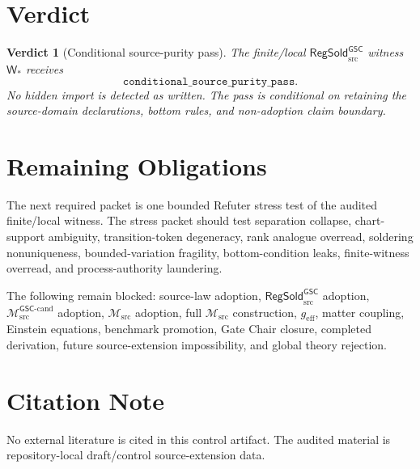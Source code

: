 \documentclass[11pt]{article}
\newcommand{\Msrc}{\mathcal{M}_{\mathrm{src}}}
\newcommand{\Mgsccand}{\mathcal{M}_{\mathrm{src}}^{\mathsf{GSC}\text{-}\mathrm{cand}}}
\newcommand{\geff}{g_{\mathrm{eff}}}
\newcommand{\RegSold}{\mathsf{RegSold}_{\mathrm{src}}^{\mathsf{GSC}}}
\newtheorem{verdict}{Verdict}
\begin{document}
\section{Verdict}

\begin{verdict}[Conditional source-purity pass]
The finite/local \(\RegSold\) witness \(\mathsf{W}_*\) receives
\[
  \texttt{conditional\_source\_purity\_pass}.
\]
No hidden import is detected as written. The pass is conditional on retaining
the source-domain declarations, bottom rules, and non-adoption claim boundary.
\end{verdict}

\section{Remaining Obligations}

The next required packet is one bounded Refuter stress test of the audited
finite/local witness. The stress packet should test separation collapse,
chart-support ambiguity, transition-token degeneracy, rank analogue overread,
soldering nonuniqueness, bounded-variation fragility, bottom-condition leaks,
finite-witness overread, and process-authority laundering.

The following remain blocked: source-law adoption, \(\RegSold\) adoption,
\(\Mgsccand\) adoption, \(\Msrc\) adoption, full \(\Msrc\) construction,
\(\geff\), matter coupling, Einstein equations, benchmark promotion, Gate
Chair closure, completed derivation, future source-extension impossibility,
and global theory rejection.

\section*{Citation Note}

No external literature is cited in this control artifact. The audited material
is repository-local draft/control source-extension data.
\end{document}
